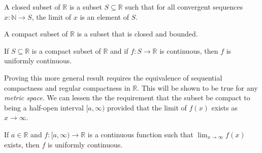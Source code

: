 \documentclass[crop=false,class=book,oneside]{standalone}
\begin{document}
            \begin{definition}
                A closed subset of $\mathbb{R}$ is a subset
                $S\subseteq\mathbb{R}$ such that for all
                convergent sequences
                $x:\mathbb{N}\rightarrow{S}$, the limit of
                $x$ is an element of $S$.
            \end{definition}
            \begin{definition}
                A compact subset of $\mathbb{R}$ is a subset
                that is closed and bounded.
            \end{definition}
            \begin{theorem}
                If $S\subseteq\mathbb{R}$ is a compact subset
                of $\mathbb{R}$ and if
                $f:S\rightarrow\mathbb{R}$ is continuous,
                then $f$ is uniformly continuous.
            \end{theorem}
            Proving this more general result requires
            the equivalence of sequential compactness and
            regular compactness in $\mathbb{R}$. This will be
            shown to be true for any \textit{metric space}.
            We can lessen the the requirement that
            the subset be compact to being a
            half-open interval $[a,\infty)$ provided that
            the limit of $f(x)$ exists as
            $x\rightarrow\infty$.
            \begin{theorem}
                If $a\in\mathbb{R}$ and
                $f:[a,\infty)\rightarrow\mathbb{R}$ is
                a continuous function such that
                $\lim_{x\rightarrow\infty}f(x)$ exists,
                then $f$ is uniformly continuous.
            \end{theorem}
\end{document}
